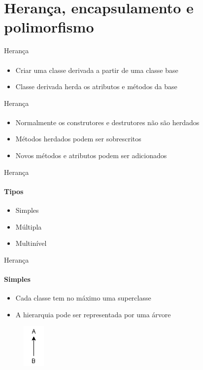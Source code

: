 \section{Herança, encapsulamento e polimorfismo}

\begin{frame}{Herança}
\framesubtitle{}
\begin{itemize}
    \item Criar uma classe derivada a partir de uma classe base
    \item Classe derivada herda os atributos e métodos da base
\end{itemize}
\end{frame}

\begin{frame}{Herança}
\framesubtitle{}
\begin{itemize}
    \item Normalmente os construtores e destrutores não são herdados
    \item Métodos herdados podem ser sobrescritos
    \item Novos métodos e atributos podem ser adicionados
\end{itemize}
\end{frame}

\begin{frame}{Herança}
\framesubtitle{Tipos}
\begin{itemize}
    \item Simples
    \item Múltipla
    \item Multinível
\end{itemize}
\end{frame}

\begin{frame}{Herança}
\framesubtitle{Simples}
\begin{itemize}
    \item Cada classe tem no máximo uma superclasse
    \item A hierarquia pode ser representada por uma árvore
\end{itemize}
\begin{figure}
	\includegraphics{img/simples}
\end{figure}
\end{frame}

